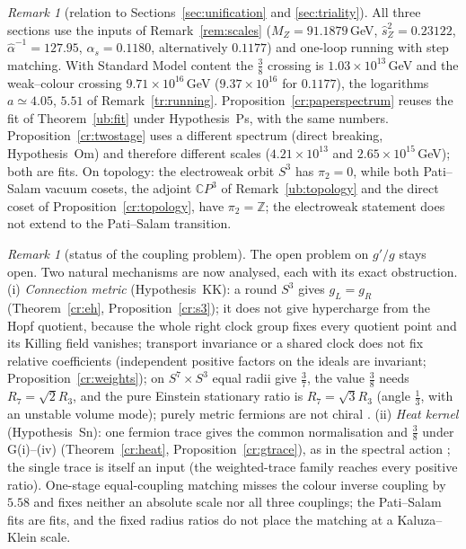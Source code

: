 \documentclass[aps,pra,onecolumn,superscriptaddress,nofootinbib,10pt]{revtex4-2}
\theoremstyle{definition}
\theoremstyle{remark}
\newtheorem{remark}[theorem]{Remark}
\newcommand{\C}{\mathbb{C}}
\newcommand{\Z}{\mathbb{Z}}
\begin{document}
\begin{remark}[relation to Sections~\ref{sec:unification} and \ref{sec:triality}]\label{rem:crreconcile}
All three sections use the inputs of Remark~\ref{rem:scales} ($M_Z=91.1879$\,GeV, $\hat s_Z^2=0.23122$, $\hat\alpha^{-1}=127.95$,
$\alpha_s=0.1180$, alternatively $0.1177$) and one-loop running with step matching.  With Standard Model content
the $\tfrac38$ crossing is $1.03\times10^{13}$\,GeV and the weak--colour crossing $9.71\times10^{16}$\,GeV ($9.37\times10^{16}$ for $0.1177$),
the logarithms $a\simeq4.05$, $5.51$ of Remark~\ref{tr:running}.  Proposition~\ref{cr:paperspectrum} reuses the fit of
Theorem~\ref{ub:fit} under Hypothesis~Ps, with the same numbers.  Proposition~\ref{cr:twostage} uses a different
spectrum (direct breaking, Hypothesis~Om) and therefore different scales ($4.21\times10^{13}$ and $2.65\times10^{15}$\,GeV); both are
fits.  On topology: the electroweak orbit $S^3$ has $\pi_2=0$, while both Pati--Salam vacuum cosets, the adjoint
$\C P^3$ of Remark~\ref{ub:topology} and the direct coset of Proposition~\ref{cr:topology}, have $\pi_2=\Z$; the electroweak
statement does not extend to the Pati--Salam transition.
\end{remark}

\begin{remark}[status of the coupling problem]\label{rem:crstatus}
The open problem on $g'/g$ stays open.  Two natural mechanisms are now analysed, each with its exact obstruction.
(i) \emph{Connection metric} (Hypothesis~KK): a round $S^3$ gives $g_L=g_R$ (Theorem~\ref{cr:eh}, Proposition~\ref{cr:s3});
it does not give hypercharge from the Hopf quotient, because the whole right clock group fixes every quotient
point and its Killing field vanishes; transport invariance or a shared clock does not fix relative
coefficients (independent positive factors on the ideals are invariant; Proposition~\ref{cr:weights}); on $S^7\times S^3$
equal radii give $\tfrac37$, the value $\tfrac38$ needs $R_7=\sqrt2R_3$, and the pure Einstein stationary ratio is $R_7=\sqrt3R_3$
(angle $\tfrac13$, with an unstable volume mode); purely metric fermions are not chiral \cite{cr:wittenkk}.
(ii) \emph{Heat kernel} (Hypothesis~Sn): one fermion trace gives the common normalisation and $\tfrac38$ under
G(i)--(iv) (Theorem~\ref{cr:heat}, Proposition~\ref{cr:gtrace}), as in the spectral action \cite{n7:CC,cr:ccm}; the
single trace is itself an input (the weighted-trace family reaches every positive ratio).  One-stage
equal-coupling matching misses the colour inverse coupling by $5.58$ and fixes neither an absolute scale nor
all three couplings; the Pati--Salam fits are fits, and the fixed radius ratios do not place the matching at
a Kaluza--Klein scale.
\end{remark}
\end{document}
